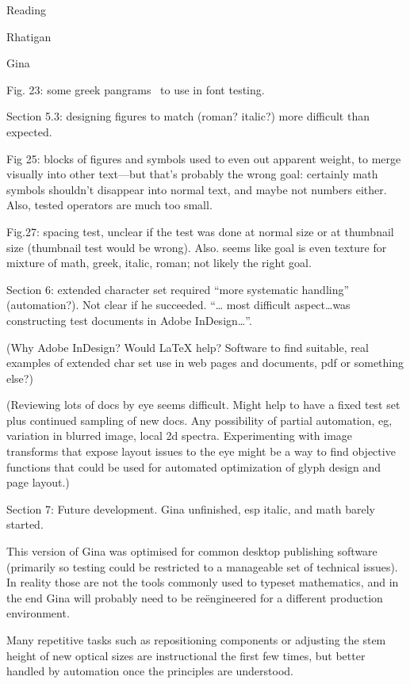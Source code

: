 \documentclass[11pt]{PalisadesLakesBook}
\begin{document}
\begin{plSection}{Reading}
\begin{plSection}{Rhatigan}
\begin{plSection}{Gina}
\begin{plSection}{}
Fig. 23: some greek pangrams~\cite{wiki:Pangram} 
to use in font testing.

Section 5.3: designing figures to match (roman? italic?)
more difficult than expected.

Fig 25: blocks of figures and symbols used to even out apparent
weight, to merge visually into other text---but that's probably
the wrong goal: certainly math symbols shouldn't disappear into
normal text, and maybe not numbers either.
Also, tested operators are much too small.

Fig.27: spacing test, unclear if the test was done at normal size
or at thumbnail size (thumbnail test would be wrong). Also. seems
like goal is even texture for mixture of math, greek, italic, 
roman; not likely the right goal.

Section 6: extended character set required 
``more systematic handling'' (automation?).
Not clear if he succeeded.
``{\ldots} most difficult aspect{\ldots}was constructing test
documents in Adobe InDesign{\ldots}''. 

(Why Adobe InDesign? 
Would {\LaTeX} help?
Software to find suitable, real examples of extended char set use 
in web pages and documents, pdf or something else?) 

(Reviewing lots of docs by eye seems difficult.
Might help to have a fixed test set plus continued sampling
of new docs.
Any possibility of partial automation, eg, variation in blurred
image, local 2d spectra.
Experimenting with image transforms that expose layout issues 
to the eye might be a way to find objective functions that
could be used for automated optimization of glyph design
and page layout.) 

Section 7: Future development. Gina unfinished, esp italic,
and math barely started.

\begin{plQuote}{}{}
This version of Gina was optimised for common desktop publishing
software (primarily so testing could be restricted to a 
manageable set of technical issues). 
In reality those are not the tools commonly used to typeset 
mathematics, and in the end Gina will probably need to be
re\"{e}ngineered for a different production environment.
\end{plQuote}
 
\begin{plQuote}{}{}
Many repetitive tasks such as repositioning components or
adjusting the stem height of new optical sizes are instructional 
the first few times,
but better handled by automation 
once the principles are understood.


\end{plQuote}
\end{plSection}
\end{plSection}
\end{plSection}
\end{plSection}
\end{document}
